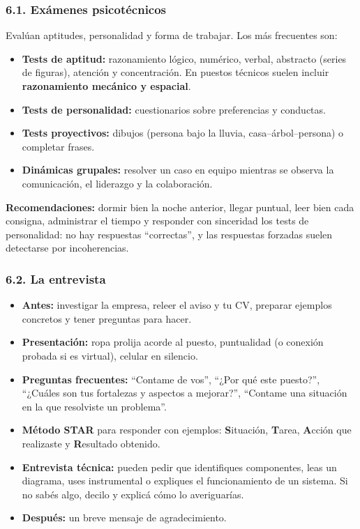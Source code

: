 \subsubsection*{6.1. Exámenes psicotécnicos}
Evalúan aptitudes, personalidad y forma de trabajar. Los más frecuentes son:
\begin{itemize}
  \item \textbf{Tests de aptitud:} razonamiento lógico, numérico, verbal, abstracto (series de
        figuras), atención y concentración. En puestos técnicos suelen incluir
        \textbf{razonamiento mecánico y espacial}.
  \item \textbf{Tests de personalidad:} cuestionarios sobre preferencias y conductas.
  \item \textbf{Tests proyectivos:} dibujos (persona bajo la lluvia, casa--árbol--persona) o
        completar frases.
  \item \textbf{Dinámicas grupales:} resolver un caso en equipo mientras se observa la
        comunicación, el liderazgo y la colaboración.
\end{itemize}
\textbf{Recomendaciones:} dormir bien la noche anterior, llegar puntual, leer bien cada
consigna, administrar el tiempo y responder con sinceridad los tests de personalidad: no hay
respuestas ``correctas'', y las respuestas forzadas suelen detectarse por incoherencias.

\subsubsection*{6.2. La entrevista}
\begin{itemize}
  \item \textbf{Antes:} investigar la empresa, releer el aviso y tu CV, preparar ejemplos
        concretos y tener preguntas para hacer.
  \item \textbf{Presentación:} ropa prolija acorde al puesto, puntualidad (o conexión probada si
        es virtual), celular en silencio.
  \item \textbf{Preguntas frecuentes:} ``Contame de vos'', ``¿Por qué este puesto?'',
        ``¿Cuáles son tus fortalezas y aspectos a mejorar?'', ``Contame una situación en la
        que resolviste un problema''.
  \item \textbf{Método STAR} para responder con ejemplos: \textbf{S}ituación, \textbf{T}area,
        \textbf{A}cción que realizaste y \textbf{R}esultado obtenido.
  \item \textbf{Entrevista técnica:} pueden pedir que identifiques componentes, leas un
        diagrama, uses instrumental o expliques el funcionamiento de un sistema. Si no sabés
        algo, decilo y explicá cómo lo averiguarías.
  \item \textbf{Después:} un breve mensaje de agradecimiento.
\end{itemize}

